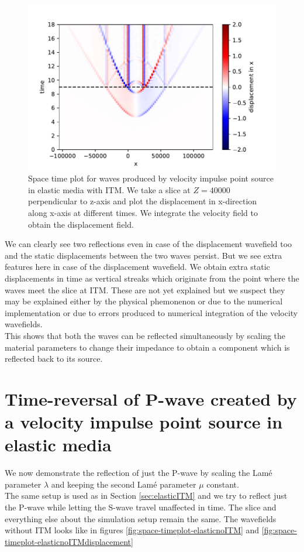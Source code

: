 \begin{figure}
    \centering
    \includegraphics[width=0.75\linewidth]{figures/Elastic-tworeflections-displacement.pdf}
    \caption{Space time plot for waves produced by velocity impulse point source in elastic media with \ac{ITM}. We take a slice at $Z=40000$ perpendicular to z-axis
    and plot the displacement in x-direction along x-axis at different times. We integrate the velocity field to obtain the displacement field.}
    \label{fig:space-timeplot-elasticITMdisplacement}
\end{figure}

We can clearly see two reflections even in case of the displacement wavefield too and the static displacements between the two waves persist. But we see extra features
here in case of the displacement wavefield. We obtain extra static displacements in time as vertical streaks which originate from the point where the waves meet the slice
at \ac{ITM}. These are not yet explained but we suspect they may be explained either by the physical phemonenon or due to the numerical implementation or due to errors
produced to numerical integration of the velocity wavefields. \\

This shows that both the waves can be reflected simultaneously by scaling the material parameters to change their impedance to obtain a component which 
is reflected back to its source.

\section{Time-reversal of P-wave created by a velocity impulse point source in elastic media} \label{sec:elasticITMpwave}
We now demonstrate the reflection of just the P-wave by scaling the Lam\'{e} parameter $\lambda$ and keeping the second Lam\'{e} parameter $\mu$ constant.\\
The same setup is used as in Section \ref{sec:elasticITM} and we try to reflect just the P-wave while letting the S-wave travel unaffected in time. The slice
and everything else about the simulation setup remain the same. The wavefields without \ac{ITM} looks like in figures \ref{fig:space-timeplot-elasticnoITM} and
\ref{fig:space-timeplot-elasticnoITMdisplacement}

